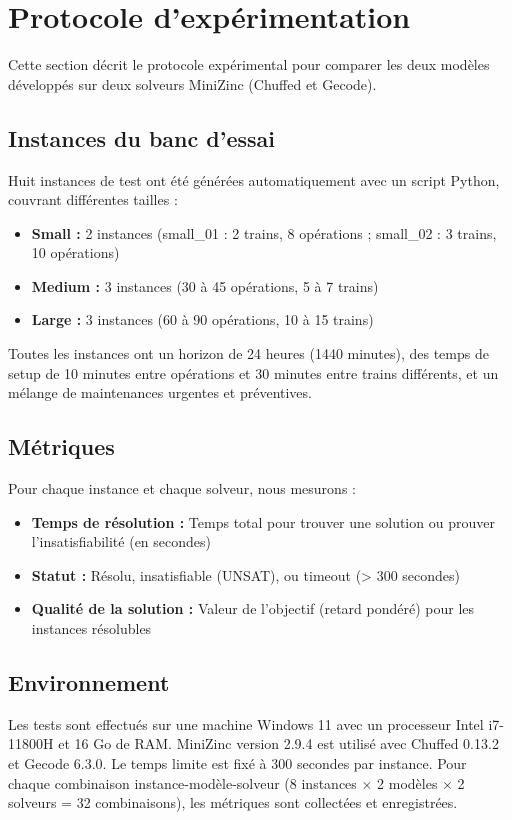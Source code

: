 \section{Protocole d'expérimentation}
\label{sec:protocole}

Cette section décrit le protocole expérimental pour comparer les deux modèles développés sur deux solveurs MiniZinc (Chuffed et Gecode).

\subsection{Instances du banc d'essai}

Huit instances de test ont été générées automatiquement avec un script Python, couvrant différentes tailles :
\begin{itemize}
    \item \textbf{Small :} 2 instances (small\_01 : 2 trains, 8 opérations ; small\_02 : 3 trains, 10 opérations)
    \item \textbf{Medium :} 3 instances (30 à 45 opérations, 5 à 7 trains)
    \item \textbf{Large :} 3 instances (60 à 90 opérations, 10 à 15 trains)
\end{itemize}

Toutes les instances ont un horizon de 24 heures (1440 minutes), des temps de setup de 10 minutes entre opérations et 30 minutes entre trains différents, et un mélange de maintenances urgentes et préventives.

\subsection{Métriques}

Pour chaque instance et chaque solveur, nous mesurons :
\begin{itemize}
    \item \textbf{Temps de résolution :} Temps total pour trouver une solution ou prouver l'insatisfiabilité (en secondes)
    \item \textbf{Statut :} Résolu, insatisfiable (UNSAT), ou timeout (> 300 secondes)
    \item \textbf{Qualité de la solution :} Valeur de l'objectif (retard pondéré) pour les instances résolubles
\end{itemize}

\subsection{Environnement}

Les tests sont effectués sur une machine Windows 11 avec un processeur Intel i7-11800H et 16 Go de RAM. MiniZinc version 2.9.4 est utilisé avec Chuffed 0.13.2 et Gecode 6.3.0. Le temps limite est fixé à 300 secondes par instance. Pour chaque combinaison instance-modèle-solveur (8 instances × 2 modèles × 2 solveurs = 32 combinaisons), les métriques sont collectées et enregistrées.
